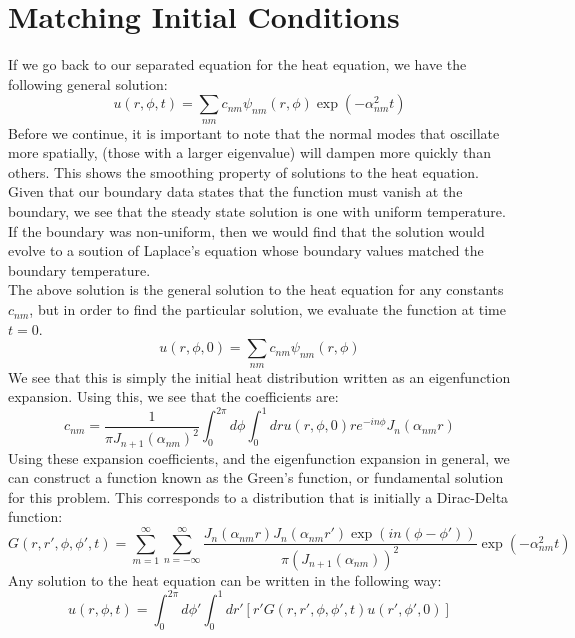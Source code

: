 \documentclass{article}
\begin{document}
\section{Matching Initial Conditions}
If we go back to our separated equation for the heat equation, we have the following general solution:
\begin{equation}
  u(r,\phi,t) = \sum_{nm} c_{nm} \psi_{nm}(r,\phi) \exp(-\alpha_{nm}^2 t)
\end{equation}
Before we continue, it is important to note that the normal modes that oscillate more spatially, (those with a larger eigenvalue) will dampen more quickly than others. This shows the smoothing property of solutions to the heat equation. Given that our boundary data states that the function must vanish at the boundary, we see that the steady state solution is one with uniform temperature. If the boundary was non-uniform, then we would find that the solution would evolve to a soution of Laplace's equation whose boundary values matched the boundary temperature.\\
The above solution is the general solution to the heat equation for any constants $c_{nm}$, but in order to find the particular solution, we evaluate the function at time $t=0$.
\begin{equation}
  u(r,\phi,0) = \sum_{nm} c_{nm} \psi_{nm}(r,\phi) 
\end{equation}
We see that this is simply the initial heat distribution written as an eigenfunction expansion. Using this, we see that the coefficients are:
\begin{equation}
  c_{nm} = \frac{1}{\pi J_{n+1}(\alpha_{nm})^2}\int_0^{2\pi} d\phi\int_0^1 dr u(r,\phi,0) r e^{- i n \phi}J_n(\alpha_{nm} r)
\end{equation}
Using these expansion coefficients, and the eigenfunction expansion in general, we can construct a function known as the Green's function, or fundamental solution for this problem. This corresponds to a distribution that is initially a Dirac-Delta function:
\begin{equation}
  \boxed{
    \boxed{
      G(r,r',\phi,\phi',t) = \sum_{m = 1}^\infty \sum_{n = -\infty} ^\infty 
      \frac{J_n(\alpha_{nm} r) J_n(\alpha_{nm} r') \exp\left(i n(\phi - \phi')\right) }{\pi \left(J_{n+1}(\alpha_{nm})\right)^2}\exp\left(-\alpha_{nm}^2 t\right)
    }
  }
\end{equation}
Any solution to the heat equation can be written in the following way:
\begin{equation}
  u(r,\phi,t) = \int_0^{2\pi} d\phi' \int_0^1 dr' \left[r' G(r,r',\phi,\phi',t) u(r',\phi',0) \right]
\end{equation}
\end{document}
